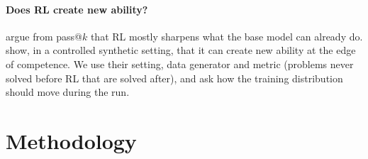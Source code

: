 \documentclass[11pt]{article}
\begin{document}
\paragraph{Does RL create new ability?} \citet{yue2025doesrl} argue from pass@$k$ that RL mostly sharpens
what the base model can already do. \citet{zhang2025interplay} show, in a controlled synthetic setting,
that it can create new ability at the edge of competence. We use their setting, data generator
\citep{zhou2025gsminfinite} and metric (problems never solved before RL that are solved after), and ask how
the training distribution should move during the run.

\section{Methodology}
\label{sec:method}
\end{document}
